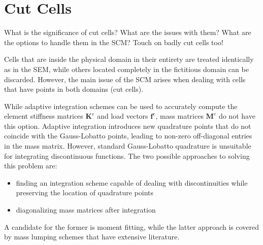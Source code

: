 %
\section{Cut Cells}
\label{section:cutcells}
%

What is the significance of cut cells?
What are the issues with them?
What are the options to handle them in the SCM?
Touch on badly cut cells too!

Cells that are inside the physical domain in their entirety are treated identically as in the SEM, while others located completely in the fictitious domain can be discarded. However, the main issue of the SCM arises when dealing with cells that have points in both domains (cut cells).

While adaptive integration schemes can be used to accurately compute the element stiffness matrices $\mathbf K^e$ and load vectors $\mathbf f^e$, mass matrices $\mathbf M^e$ do not have this option. Adaptive integration introduces new quadrature points that do not coincide with the Gauss-Lobatto points, leading to non-zero off-diagonal entries in the mass matrix. However, standard Gauss-Lobatto quadrature is unsuitable for integrating discontinuous functions. The two possible approaches to solving this problem are:

\begin{itemize}
	\item finding an integration scheme capable of dealing with discontinuities while preserving the location of quadrature points
	\item diagonalizing mass matrices after integration
\end{itemize}

A candidate for the former is moment fitting, while the latter approach is covered by mass lumping schemes that have extensive literature.